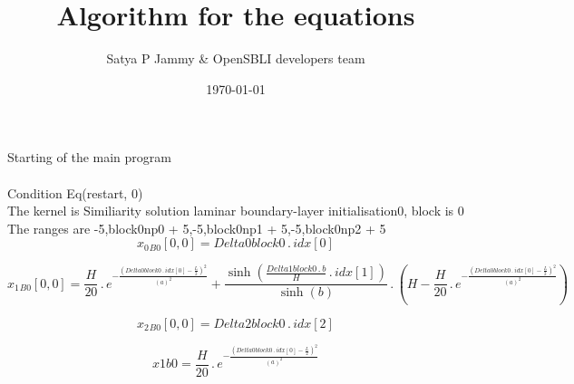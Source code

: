 \documentclass{article}
\title{Algorithm for the equations}
\author{Satya P Jammy \& OpenSBLI developers team}
\date{\today}
\begin{document}
\maketitle
\noindent Starting of the main program\\
\\\noindent Condition Eq(restart, 0)\\\noindent The kernel is Similiarity solution laminar boundary-layer initialisation0, block is 0\\\noindent The ranges are -5,block0np0 + 5,-5,block0np1 + 5,-5,block0np2 + 5\\\begin{dmath}{x_{0}{_{B0}}}[{0,0}] = Delta0block0 \,.\, {idx}[{0}]\end{dmath}

\begin{dmath}{x_{1}{_{B0}}}[{0,0}] = \frac{H}{20} \,.\, e^{- \frac{\left(Delta0block0 \,.\, {idx}[{0}] - \frac{L}{2} \right)^{2}}{\left(a \right)^{2}}} + \frac{\sinh{\left (\frac{Delta1block0 \,.\, b}{H} \,.\, {idx}[{1}] \right )}}{\sinh{\left (b 
\right )}} \,.\, \left(H - \frac{H}{20} \,.\, e^{- \frac{\left(Delta0block0 \,.\, {idx}[{0}] - \frac{L}{2} \right)^{2}}{\left(a \right)^{2}}}\right)\end{dmath}

\begin{dmath}{x_{2}{_{B0}}}[{0,0}] = Delta2block0 \,.\, {idx}[{2}]\end{dmath}

\begin{dmath}x1b0 = \frac{H}{20} \,.\, e^{- \frac{\left(Delta0block0 \,.\, {idx}[{0}] - \frac{L}{2} \right)^{2}}{\left(a \right)^{2}}}\end{dmath}
\end{document}
